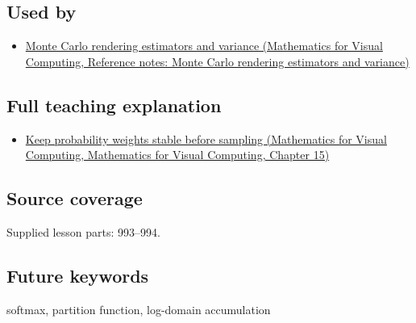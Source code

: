 \subsection{Used by}\label{appendix-d580b422240f-used-by}

\begin{itemize}
\tightlist
\item
  \href{../02-Mathematics-for-Visual-Computing/main.pdf\#nameddest=appendix-031e02bf28af}{Monte Carlo rendering estimators and variance (Mathematics for Visual Computing, Reference notes: Monte Carlo rendering estimators and variance)}
\end{itemize}

\subsection{Full teaching explanation}\label{appendix-d580b422240f-full-teaching-explanation}

\begin{itemize}
\tightlist
\item
  \href{../02-Mathematics-for-Visual-Computing/main.pdf\#nameddest=02-foundations-ii-ch031-keep-probability-weights-stable-before-sampling}{Keep probability weights stable before sampling (Mathematics for Visual Computing, Mathematics for Visual Computing, Chapter 15)}
\end{itemize}

\subsection{Source coverage}\label{appendix-d580b422240f-source-coverage}

Supplied lesson parts: 993--994.

\subsection{Future keywords}\label{appendix-d580b422240f-future-keywords}

softmax, partition function, log-domain accumulation
